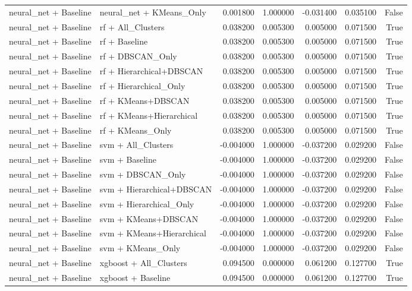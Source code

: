 \begin{tabular}{llrrrrr}
neural_net + Baseline & neural_net + KMeans_Only & 0.001800 & 1.000000 & -0.031400 & 0.035100 & False \\
neural_net + Baseline & rf + All_Clusters & 0.038200 & 0.005300 & 0.005000 & 0.071500 & True \\
neural_net + Baseline & rf + Baseline & 0.038200 & 0.005300 & 0.005000 & 0.071500 & True \\
neural_net + Baseline & rf + DBSCAN_Only & 0.038200 & 0.005300 & 0.005000 & 0.071500 & True \\
neural_net + Baseline & rf + Hierarchical+DBSCAN & 0.038200 & 0.005300 & 0.005000 & 0.071500 & True \\
neural_net + Baseline & rf + Hierarchical_Only & 0.038200 & 0.005300 & 0.005000 & 0.071500 & True \\
neural_net + Baseline & rf + KMeans+DBSCAN & 0.038200 & 0.005300 & 0.005000 & 0.071500 & True \\
neural_net + Baseline & rf + KMeans+Hierarchical & 0.038200 & 0.005300 & 0.005000 & 0.071500 & True \\
neural_net + Baseline & rf + KMeans_Only & 0.038200 & 0.005300 & 0.005000 & 0.071500 & True \\
neural_net + Baseline & svm + All_Clusters & -0.004000 & 1.000000 & -0.037200 & 0.029200 & False \\
neural_net + Baseline & svm + Baseline & -0.004000 & 1.000000 & -0.037200 & 0.029200 & False \\
neural_net + Baseline & svm + DBSCAN_Only & -0.004000 & 1.000000 & -0.037200 & 0.029200 & False \\
neural_net + Baseline & svm + Hierarchical+DBSCAN & -0.004000 & 1.000000 & -0.037200 & 0.029200 & False \\
neural_net + Baseline & svm + Hierarchical_Only & -0.004000 & 1.000000 & -0.037200 & 0.029200 & False \\
neural_net + Baseline & svm + KMeans+DBSCAN & -0.004000 & 1.000000 & -0.037200 & 0.029200 & False \\
neural_net + Baseline & svm + KMeans+Hierarchical & -0.004000 & 1.000000 & -0.037200 & 0.029200 & False \\
neural_net + Baseline & svm + KMeans_Only & -0.004000 & 1.000000 & -0.037200 & 0.029200 & False \\
neural_net + Baseline & xgboost + All_Clusters & 0.094500 & 0.000000 & 0.061200 & 0.127700 & True \\
neural_net + Baseline & xgboost + Baseline & 0.094500 & 0.000000 & 0.061200 & 0.127700 & True \\

\end{tabular}
